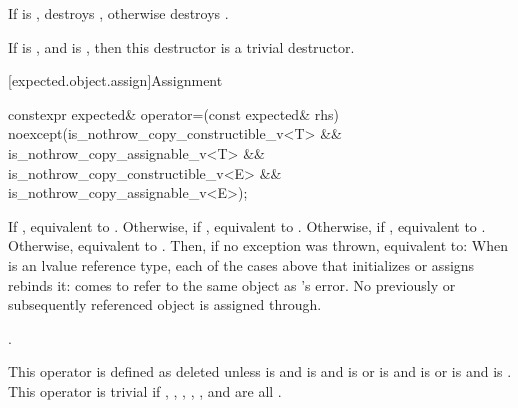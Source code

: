 \begin{itemdescr}

\pnum
\effects
If  is , destroys , otherwise destroys .

\pnum
\remarks
If  is , and  is , then this destructor is a trivial destructor.
\end{itemdescr}

[expected.object.assign]{Assignment}

%
\begin{itemdecl}
constexpr expected& operator=(const expected& rhs) noexcept(is_nothrow_copy_constructible_v<T> &&
                                                            is_nothrow_copy_assignable_v<T> &&
                                                            is_nothrow_copy_constructible_v<E> &&
                                                            is_nothrow_copy_assignable_v<E>);
\end{itemdecl}

\begin{itemdescr}

\pnum
\effects
If , equivalent to . Otherwise, if , equivalent to . Otherwise, if , equivalent to . Otherwise, equivalent to . Then, if no exception was thrown, equivalent to:  When  is an lvalue reference type, each of the cases above that initializes or assigns  rebinds it:  comes to refer to the same object as 's error. No previously or subsequently referenced object is assigned through.

\pnum
\returns
{}.

\pnum
\remarks
This operator is defined as deleted unless  is  and  is  and  is  or  is  and  is  or  is  and  is . This operator is trivial if , , , , , and  are all .
\end{itemdescr}

